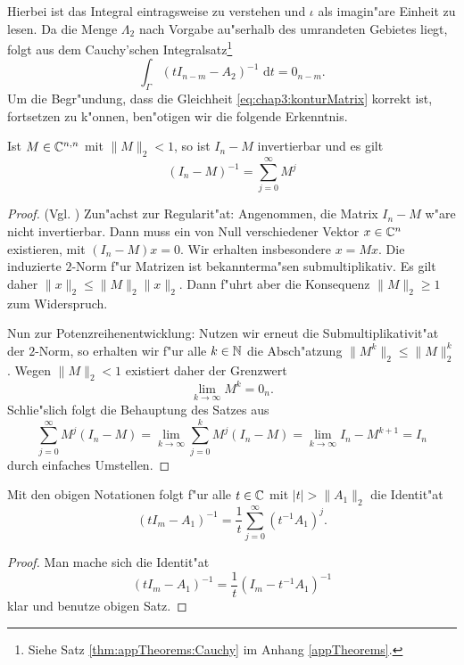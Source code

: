 Hierbei ist das Integral eintragsweise zu verstehen und $\iota$ als imagin"are Einheit zu lesen.
Da die Menge $\Lambda_2$ nach Vorgabe au"serhalb des umrandeten Gebietes liegt, folgt aus dem Cauchy'schen Integralsatz\footnote{Siehe Satz \ref{thm:appTheorems:Cauchy} im Anhang \ref{appTheorems}.}
\[
\int_\Gamma (t I_{n-m} - A_2)^{-1} \text{ d}t = 0_{n-m}.
\]
Um die Begr"undung, dass die Gleichheit \eqref{eq:chap3:konturMatrix} korrekt ist, fortsetzen zu k"onnen, ben"otigen wir die folgende Erkenntnis.

\begin{thm}\label{potenzreihe}
Ist $M\in\mathbb{C}^{n,n}$ mit $\|M\|_2 < 1$, so ist $I_n - M$ invertierbar und es gilt
\[
(I_n - M)^{-1} = \sum_{j=0}^\infty M^j
\]
\end{thm}

\begin{proof} (Vgl. \cite[Abschnitt 2.3.4]{loan})
Zun"achst zur Regularit"at: Angenommen, die Matrix $I_n-M$ w"are nicht invertierbar. Dann muss ein von Null verschiedener Vektor $x\in\mathbb{C}^n$ existieren, mit $(I_n-M)x = 0$.
Wir erhalten insbesondere $x = Mx$. Die induzierte $2$-Norm f"ur Matrizen ist bekannterma"sen submultiplikativ.
Es gilt daher $\|x\|_2 \le \|M\|_2\|x\|_2$. Dann f"uhrt aber die Konsequenz $\|M\|_2 \ge 1$ zum Widerspruch.

\newpage

Nun zur Potenzreihenentwicklung: Nutzen wir erneut die Submultiplikativit"at der $2$-Norm, so erhalten wir f"ur alle $k\in\mathbb{N}$ die Absch"atzung $\|M^k\|_2 \le \|M\|_2^k$. Wegen $\|M\|_2 <1$ existiert daher der Grenzwert
\[
\lim_{k\to\infty} M^k = 0_n.
\]
Schlie"slich folgt die Behauptung des Satzes aus
\[
\sum_{j=0}^\infty M^j (I_n-M) =
\lim_{k\to\infty}\sum_{j=0}^k M^j (I_n-M) =
\lim_{k\to\infty} I_n-M^{k+1} = I_n
\]
durch einfaches Umstellen.
\end{proof}

\begin{kor}\label{kor:chap3:potenzreihe}
Mit den obigen Notationen folgt f"ur alle $t\in\mathbb{C}$ mit $|t| > \|A_1\|_2$ die Identit"at
\[
(t I_m - A_1)^{-1} = \frac{1}{t} \sum_{j=0}^\infty (t^{-1} A_1)^j.
\]
\end{kor}
\begin{proof}
Man mache sich die Identit"at
\[
(t I_m - A_1)^{-1} = \frac{1}{t}(I_m - t^{-1}A_1)^{-1}
\]
klar und benutze obigen Satz.
\end{proof}

